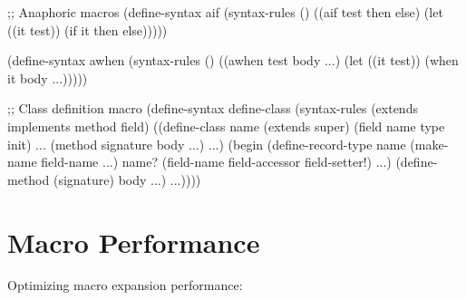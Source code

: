 \begin{example}
\begin{lambdustcode}
;; Anaphoric macros
(define-syntax aif
  (syntax-rules ()
    ((aif test then else)
     (let ((it test))
       (if it then else)))))

(define-syntax awhen  
  (syntax-rules ()
    ((awhen test body ...)
     (let ((it test))
       (when it body ...)))))

;; Class definition macro
(define-syntax define-class
  (syntax-rules (extends implements method field)
    ((define-class name (extends super) (field name type init) ... (method signature body ...) ...)
     (begin
       (define-record-type name 
         (make-name field-name ...)
         name?
         (field-name field-accessor field-setter!) ...)
       (define-method (signature) body ...) ...))))
\end{lambdustcode}
\end{example}

\section{Macro Performance}
\label{sec:macro-performance}


Optimizing macro expansion performance:


